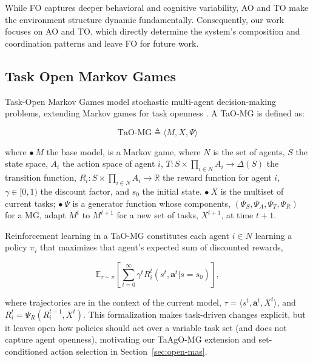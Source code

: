 
While FO captures deeper behavioral and cognitive variability, AO and TO make the environment structure dynamic fundamentally. Consequently, our work focuses on AO and TO, which directly determine the system’s composition and coordination patterns and leave FO for future work. 

\subsection{Task Open Markov Games}
\label{sec:tao-mg}
\noindent Task-Open Markov Games model stochastic multi-agent decision-making problems, extending Markov games \cite{Littman} for task openness \cite{anilmohito}. A TaO-MG is defined as:

$$
\text{TaO-MG} \triangleq \langle {M}, X, \Psi \rangle 
$$

\noindent where $\bullet\ M$ the base model, is a Markov game, where $N$ is the set of agents, $S$ the state space, $A_i$ the action space of agent $i$, $T: S \times \prod_{i \in N} A_i \to \Delta(S)$ the transition function, $R_i: S \times \prod_{i \in N} A_i \to \mathbb{R}$ the reward function for agent $i$, $\gamma \in [0,1)$ the discount factor, and $s_0$ the initial state. $\bullet\ X$ is the multiset of current tasks; $\bullet\ \Psi$ is a generator function whose components, $(\Psi_S,\Psi_A,\Psi_T,\Psi_R)$ for a MG, adapt $M^t$ to $M^{t+1}$ for a new set of tasks, $X^{t+1}$, at time $t+1$. 

Reinforcement learning in a TaO-MG constitutes each agent $i\in N$ learning a policy $\pi_i$ that maximizes that agent's expected sum of discounted rewards,

$$
\mathbb{E}_{\tau\sim\pi} \left [ \sum^\infty_{t=0} \gamma^t R^t_{i}(s^t,\mathbf{a}^t | s=s_0) \right ],
$$

\noindent where trajectories are in the context of the current model, $\tau=\langle s^t,\mathbf{a}^t,X^t\rangle$, and $R_i^t=\Psi_R(R_i^{t-1},X^t)$. 
This formalization makes task-driven changes explicit, but it leaves open how policies should act over a variable task set (and does not capture agent openness), motivating our TaAgO-MG extension and set-conditioned action selection in Section~\ref{sec:open-mas}.


